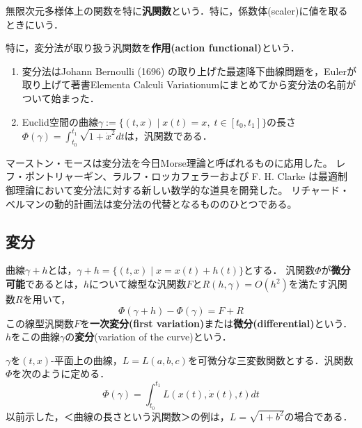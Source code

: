 \documentclass[uplatex, 12pt, dvipdfmx]{jsreport}
\begin{document}
\begin{definition}[functional]
    無限次元多様体上の関数を特に\textbf{汎関数}という．特に，係数体(scaler)に値を取るときにいう．

    特に，変分法が取り扱う汎関数を\textbf{作用(action functional)}という．
\end{definition}
\begin{example}[汎関数の例]\mbox{}
    \begin{enumerate}
        \item 変分法はJohann Bernoulli (1696) の取り上げた最速降下曲線問題を，Eulerが取り上げて著書Elementa Calculi Variationumにまとめてから変分法の名前がついて始まった．
        \item Euclid空間の曲線$\gamma:=\{(t,x)\mid x(t)=x,\; t\in[t_0,t_1]\}$の長さ$\Phi(\gamma)=\int^{t_1}_{t_0}\sqrt{1+\dot{x}^2}dt$は，汎関数である．
    \end{enumerate}
\end{example}
\begin{history}
    マーストン・モースは変分法を今日Morse理論と呼ばれるものに応用した。
    レフ・ポントリャーギン、ラルフ・ロッカフェラーおよび F. H. Clarke は最適制御理論において変分法に対する新しい数学的な道具を開発した。
    リチャード・ベルマンの動的計画法は変分法の代替となるもののひとつである。
\end{history}

\subsection{変分}

\begin{definition}
    曲線$\gamma+h$とは，$\gamma+h=\{(t,x)\mid x=x(t)+h(t)\}$とする．
    汎関数$\Phi$が\textbf{微分可能}であるとは，$h$について線型な汎関数$F$と$R(h,\gamma)=O(h^2)$を満たす汎関数$R$を用いて，
    \[ \Phi(\gamma+h)-\Phi(\gamma) = F+R \]
    この線型汎関数$F$を\textbf{一次変分(first variation)}または\textbf{微分(differential)}という．$h$をこの曲線$\gamma$の\textbf{変分}(variation of the curve)という．
\end{definition}
\begin{example}
    $\gamma$を$(t,x)$-平面上の曲線，$L=L(a,b,c)$を可微分な三変数関数とする．汎関数$\Phi$を次のように定める．
    \[ \Phi(\gamma) = \int^{t_1}_{t_0}L(x(t),\dot{x}(t),t)dt \]
    以前示した，＜曲線の長さという汎関数＞の例は，$L=\sqrt{1+b^2}$の場合である．
\end{example}
\end{document}
